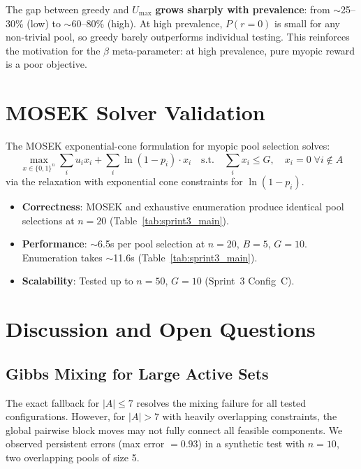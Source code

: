 \documentclass[11pt,a4paper]{article}
\begin{document}
\begin{finding}
The gap between greedy and $U_{\max}$ \textbf{grows sharply with prevalence}: from $\sim$25--30\% (low) to $\sim$60--80\% (high).
At high prevalence, $P(r{=}0)$ is small for any non-trivial pool, so greedy barely outperforms individual testing.
This reinforces the motivation for the $\beta$ meta-parameter: at high prevalence, pure myopic reward is a poor objective.
\end{finding}


\section{MOSEK Solver Validation}
\label{sec:mosek}

The MOSEK exponential-cone formulation for myopic pool selection solves:
\[
  \max_{x \in \{0,1\}^n} \sum_i u_i x_i + \sum_i \ln(1-p_i) \cdot x_i
  \quad \text{s.t.} \quad \sum_i x_i \leq G, \quad x_i = 0 \;\forall i \notin A
\]
via the relaxation with exponential cone constraints for $\ln(1-p_i)$.

\begin{itemize}
  \item \textbf{Correctness}: MOSEK and exhaustive enumeration produce identical pool selections at $n=20$ (Table~\ref{tab:sprint3_main}).
  \item \textbf{Performance}: $\sim$6.5s per pool selection at $n=20$, $B=5$, $G=10$. Enumeration takes $\sim$11.6s (Table~\ref{tab:sprint3_main}).
  \item \textbf{Scalability}: Tested up to $n=50$, $G=10$ (Sprint~3 Config~C).
\end{itemize}


\section{Discussion and Open Questions}
\label{sec:discussion}

\subsection{Gibbs Mixing for Large Active Sets}

The exact fallback for $|A| \leq 7$ resolves the mixing failure for all tested configurations.
However, for $|A| > 7$ with heavily overlapping constraints, the global pairwise block moves may not fully connect all feasible components.
We observed persistent errors (max error $= 0.93$) in a synthetic test with $n=10$, two overlapping pools of size 5.
\end{document}
